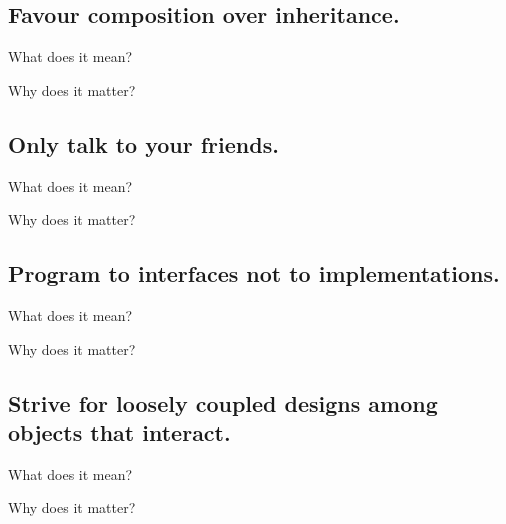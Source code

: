 \documentclass{beamer}
\begin{document}
\begin{frame}{}
    
\end{frame}

\begin{frame}{}
    
\end{frame}

\begin{frame}{}
    
\end{frame}

\subsection{Favour composition over inheritance.}

\begin{frame}{What does it mean?}
\end{frame}

\begin{frame}{Why does it matter?}
\end{frame}

\subsection{Only talk to your friends.}

\begin{frame}{What does it mean?}
\end{frame}

\begin{frame}{Why does it matter?}
\end{frame}

\subsection{Program to interfaces not to implementations.}

\begin{frame}{What does it mean?}
\end{frame}

\begin{frame}{Why does it matter?}
\end{frame}

\subsection{Strive for loosely coupled designs among objects that interact.}

\begin{frame}{What does it mean?}
\end{frame}

\begin{frame}{Why does it matter?}
\end{frame}
\end{document}
